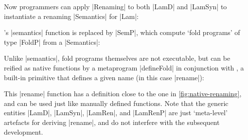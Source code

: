 \documentclass[sigplan,review,fleqn]{acmart}
\renewcommand{\verb}{\collectverb{\color{AgdaFunction}}}
\begin{document}

Now programmers can apply \verb|Renaming| to both \verb|LamD| and \verb|LamSyn| to instantiate a renaming \verb|Semantics| for \verb|Lam|:
\begin{code}
	\>[0]\AgdaSpace{}%
	\AgdaSymbol{=}\AgdaSpace{}%
	\AgdaSpace{}%
	\AgdaSpace{}%
	\<%
\end{code}
\citeauthor{Allais-generic-syntax}'s \verb|semantics| function is replaced by \verb|SemP|, which compute `fold programs' of type \verb|FoldP| from a \verb|Semantics|:
\begin{code}
	\>[0]\AgdaSpace{}%
	\AgdaSymbol{=}\AgdaSpace{}%
	\AgdaSpace{}%
	\AgdaSpace{}%
	\AgdaSpace{}%
	\<%
\end{code}
Unlike \verb|semantics|, fold programs themselves are not executable, but can be reified as native functions by a metaprogram \verb|defineFold| in conjunction with , a built-in primitive that defines a given name (in this case \verb|rename|):
\begin{code}
	\>[0]\AgdaSpace{}%
	\AgdaSpace{}%
	\AgdaSymbol{=}\AgdaSpace{}%
	\AgdaSpace{}%
	\AgdaSpace{}%
	\<%
\end{code}
This \verb|rename| function has a definition close to the one in \cref{fig:native-renaming}, and can be used just like manually defined functions.
Note that the generic entities \verb|LamD|, \verb|LamSyn|, \verb|LamRen|, and \verb|LamRenP| are just `meta-level' artefacts for deriving \verb|rename|, and do not interfere with the subsequent development.


\end{document}
